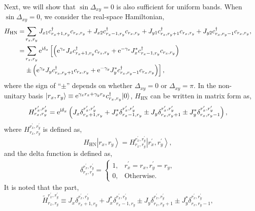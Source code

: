Next, we will show that $\sin\Delta_{xy}=0$ is also sufficient for
uniform bands. When $\sin\Delta_{xy}=0$, we consider the real-space
Hamiltonian, 
\begin{align}
H_{\text{HN}}= & \sum_{r_{x},r_{y}}J_{x1}c_{r_{x}+1,r_{y}}^{\dagger}c_{r_{x},r_{y}}+J_{x2}c_{r_{x}-1,r_{y}}^{\dagger}c_{r_{x},r_{y}}+J_{y1}c_{r_{x},r_{y}+1}^{\dagger}c_{r_{x},r_{y}}+J_{y2}c_{r_{x},r_{y}-1}^{\dagger}c_{r_{x},r_{y}},\nonumber \\
= & \sum_{r_{x},r_{y}}\mathrm{e}^{\mathrm{i}\delta_{x}}\left[\left(\mathrm{e}^{\gamma_{x}}J_{x}c_{r_{x}+1,r_{y}}^{\dagger}c_{r_{x},r_{y}}+\mathrm{e}^{-\gamma_{x}}J_{x}^{*}c_{r_{x}-1,r_{y}}^{\dagger}c_{r_{x},r_{y}}\right)\right.\nonumber \\
 & \left.\pm\left(\mathrm{e}^{\gamma_{y}}J_{y}c_{r_{x},r_{y}+1}^{\dagger}c_{r_{x},r_{y}}+\mathrm{e}^{-\gamma_{y}}J_{y}^{*}c_{r_{x},r_{y}-1}^{\dagger}c_{r_{x},r_{y}}\right)\right],
\end{align}
where the sign of ``$\pm$'' depends on whether $\Delta_{xy}=0$
or $\Delta_{xy}=\pi$. In the non-unitary basis $|r_{x},r_{y}\rangle\equiv\mathrm{e}^{\gamma_{x}r_{x}+\gamma_{y}r_{y}}c_{r_{x},r_{y}}^{\dagger}|0\rangle$,
$H_{\text{HN}}$ can be written in matrix form as, 
\begin{equation}
H_{r_{x},r_{y}}^{r_{x}^{\prime},r_{y}^{\prime}}=\mathrm{e}^{\mathrm{i}\delta_{x}}\left(J_{x}\delta_{r_{x}+1,r_{y}}^{r_{x}^{\prime},r_{y}^{\prime}}+J_{x}^{*}\delta_{r_{x}-1,r_{y}}^{r_{x}^{\prime},r_{y}^{\prime}}\pm J_{y}\delta_{r_{x},r_{y}+1}^{r_{x}^{\prime},r_{y}^{\prime}}\pm J_{y}^{*}\delta_{r_{x},r_{y}-1}^{r_{x}^{\prime},r_{y}^{\prime}}\right),
\end{equation}
where $H_{r_{x},r_{y}}^{r_{x}^{\prime},r_{y}^{\prime}}$ is defined
as, 
\begin{equation}
H_{\text{HN}}\left|r_{x},r_{y}\right>=H_{r_{x},r_{y}}^{r_{x}^{\prime},r_{y}^{\prime}}\left|r_{x}^{\prime},r_{y}^{\prime}\right>,
\end{equation}
and the delta function is defined as, 
\begin{align}
\delta_{r_{x},r_{y}}^{r_{x}^{\prime},r_{y}^{\prime}}=\begin{cases}
1, & r_{x}^{\prime}=r_{x},r_{y}^{\prime}=r_{y},\\
0, & \text{Otherwise}.
\end{cases}
\end{align}
It is noted that the part, 
\begin{equation}
\tilde{H}_{r_{x},r_{y}}^{r_{x}^{\prime},r_{y}^{\prime}}\equiv J_{x}\delta_{r_{x}+1,r_{y}}^{r_{x}^{\prime},r_{y}^{\prime}}+J_{x}^{*}\delta_{r_{x}-1,r_{y}}^{r_{x}^{\prime},r_{y}^{\prime}}\pm J_{y}\delta_{r_{x},r_{y}+1}^{r_{x}^{\prime},r_{y}^{\prime}}\pm J_{y}^{*}\delta_{r_{x},r_{y}-1}^{r_{x}^{\prime},r_{y}^{\prime}},
\end{equation}
